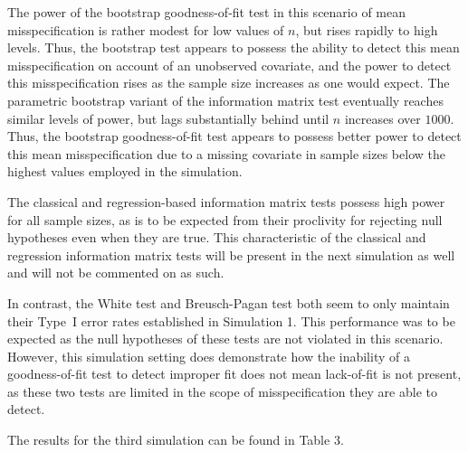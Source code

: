\documentclass[sn-mathphys-ay]{sn-jnl}
\begin{document}
The power of the bootstrap goodness-of-fit test in this scenario of mean misspecification is rather modest for low values of $n$, but rises rapidly to high levels. Thus, the bootstrap test appears to possess the
ability to detect this mean misspecification on account of an unobserved covariate, and the power to detect this misspecification rises as the sample size increases as one would expect.
The parametric bootstrap variant of the information matrix test eventually reaches similar levels of power, but lags substantially behind until $n$ increases over $1000$. Thus, the bootstrap
goodness-of-fit test appears to possess better power to detect this mean misspecification due to a missing covariate in sample sizes below the highest values employed in the simulation.

The classical and regression-based information matrix tests possess high power for all sample sizes, as is to be expected from their proclivity for rejecting null hypotheses even when they are true.
This characteristic of the classical and regression information matrix tests will be present in the next simulation as well and will not be commented on as such. 

In contrast, the White test and Breusch-Pagan test both seem to only maintain their Type~I error rates established in Simulation 1. This performance was to be expected
as the null hypotheses of these tests are not violated in this scenario. However, this simulation setting does demonstrate how the inability of a goodness-of-fit test to detect improper
fit does not mean lack-of-fit is not present, as these two tests are limited in the scope of misspecification they are able to detect.

The results for the third simulation can be found in Table 3.

\end{document}
